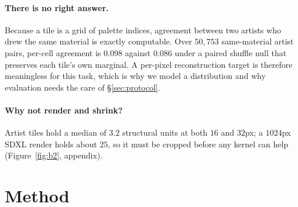\documentclass{article}
\begin{document}
\paragraph{There is no right answer.} Because a tile is a grid of palette
indices, agreement between two artists who drew the same material is exactly
computable. Over $50{,}753$ same-material artist pairs, per-cell agreement is
$0.098$ against $0.086$ under a paired shuffle null that preserves each tile's
own marginal. A per-pixel reconstruction target is therefore meaningless for
this task, which is why we model a distribution and why evaluation needs the
care of \S\ref{sec:protocol}.

\paragraph{Why not render and shrink?} Artist tiles hold a median of $3.2$
structural units at both $16$ and $32$px; a $1024$px SDXL render holds about
$25$, so it must be cropped before any kernel can help
(Figure~\ref{fig:b2}, appendix).

\section{Method}
\label{sec:method}
\end{document}
